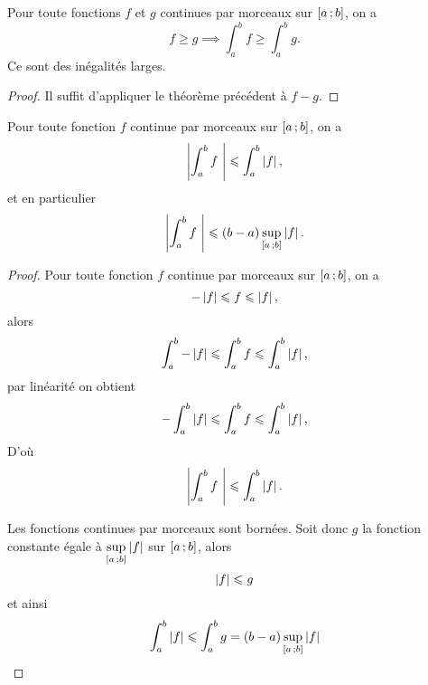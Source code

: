 \begin{theo}
   Pour toute fonctions $f$ et $g$ continues par morceaux sur $\left[ a \, ;  b \right]$, on a
  \begin{equation}
    f \geqslant g \implies \int_a^b f \geqslant \int_a^b g.
  \end{equation}
  \danger Ce sont des inégalités larges.
\end{theo}
\begin{proof}
  Il suffit d'appliquer le théorème précédent à $f-g$.
\end{proof}

\begin{theo}
  Pour toute fonction $f$ continue par morceaux sur $\left[ a \, ;  b \right]$, on a
  \begin{equation}
    \left\lvert\int_a^b f~\right\rvert \leqslant \int_a^b \left\lvert f\right\rvert,
  \end{equation}
  et en particulier
  \begin{equation}
    \left\lvert\int_a^b f~\right\rvert \leqslant (b-a) \sup\limits_{\left[ a \, ;  b \right]} \left\lvert f\right\rvert.
  \end{equation}
\end{theo}
\begin{proof}
  Pour toute fonction $f$ continue par morceaux sur $\left[ a \, ;  b \right]$, on a
  \begin{equation}
    -\left\lvert f\right\rvert \leqslant f \leqslant \left\lvert f\right\rvert,
  \end{equation}
  alors
  \begin{equation}
    \int_a^b -\left\lvert f\right\rvert \leqslant \int_a^bf \leqslant \int_a^b\left\lvert f\right\rvert,
  \end{equation}
  par linéarité on obtient
  \begin{equation}
    -\int_a^b \left\lvert f\right\rvert \leqslant \int_a^bf \leqslant \int_a^b\left\lvert f\right\rvert,
  \end{equation}
  D'où
  \begin{equation}
     \left\lvert\int_a^b f~\right\rvert \leqslant \int_a^b \left\lvert f\right\rvert.
  \end{equation}

  Les fonctions continues par morceaux sont bornées. Soit donc $g$ la fonction constante égale à $\sup\limits_{\left[ a \, ;  b \right]} \left\lvert f\right\rvert$ sur $\left[ a \, ;  b \right]$, alors
  \begin{equation}
    \left\lvert f\right\rvert \leqslant g
  \end{equation}
  et ainsi
  \begin{equation}
    \int_a^b \left\lvert f\right\rvert \leqslant \int_a^b g = (b-a) \sup\limits_{\left[ a \, ;  b \right]} \left\lvert f\right\rvert
  \end{equation}
\end{proof}


